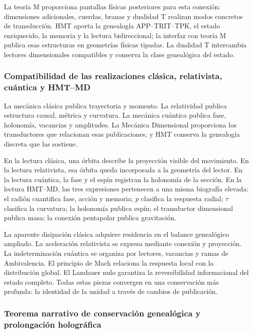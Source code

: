La teoría M proporciona pantallas físicas posteriores para esta conexión: dimensiones adicionales, cuerdas, branas y dualidad T realizan modos concretos de transducción. HMT aporta la genealogía APP–TRIT–TPK, el estado enriquecido, la memoria y la lectura bidireccional; la interfaz con teoría M publica esas estructuras en geometrías físicas tipadas. La dualidad T intercambia lectores dimensionales compatibles y conserva la clase genealógica del estado.

\subsubsection{Compatibilidad de las realizaciones clásica, relativista, cuántica y HMT--MD}

La mecánica clásica publica trayectoria y momento. La relatividad publica estructura causal, métrica y curvatura. La mecánica cuántica publica fase, holonomía, vacancias y amplitudes. La Mecánica Dimensional proporciona los transductores que relacionan esas publicaciones, y HMT conserva la genealogía discreta que las sostiene.

En la lectura clásica, una órbita describe la proyección visible del movimiento. En la lectura relativista, esa órbita queda incorporada a la geometría del lector. En la lectura cuántica, la fase y el espín registran la holonomía de la sección. En la lectura HMT–MD, las tres expresiones pertenecen a una misma biografía elevada: el radión cuantifica fase, acción y memoria; \(p\) clasifica la respuesta radial; \(\tau\) clasifica la curvatura; la holonomía publica espín; el transductor dimensional publica masa; la conexión pentapolar publica gravitación.

La aparente disipación clásica adquiere residencia en el balance genealógico ampliado. La aceleración relativista se expresa mediante conexión y proyección. La indeterminación cuántica se organiza por lectores, vacancias y ramas de Ambivalencia. El principio de Mach relaciona la respuesta local con la distribución global. El Landauer nulo garantiza la reversibilidad informacional del estado completo. Todas estas piezas convergen en una conservación más profunda: la identidad de la unidad a través de cambios de publicación.

\subsubsection{Teorema narrativo de conservación genealógica y prolongación holográfica}

